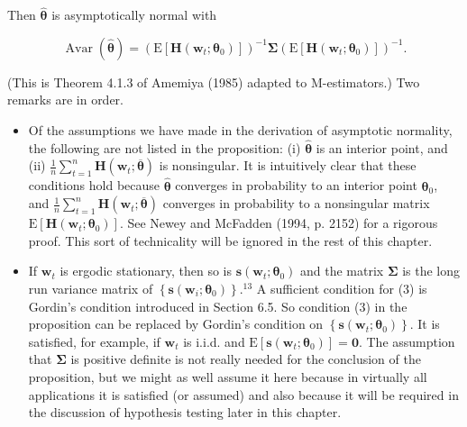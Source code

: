 \documentclass[10pt]{article}
\begin{document}
Then $\hat{\boldsymbol{\theta}}$ is asymptotically normal with

$$
\operatorname{Avar}(\hat{\boldsymbol{\theta}})=\left(\mathrm{E}\left[\mathbf{H}\left(\mathbf{w}_{t} ; \boldsymbol{\theta}_{0}\right)\right]\right)^{-1} \boldsymbol{\Sigma}\left(\mathrm{E}\left[\mathbf{H}\left(\mathbf{w}_{t} ; \boldsymbol{\theta}_{0}\right)\right]\right)^{-1} .
$$

(This is Theorem 4.1.3 of Amemiya (1985) adapted to M-estimators.) Two remarks are in order.

\begin{itemize}
  \item Of the assumptions we have made in the derivation of asymptotic normality, the following are not listed in the proposition: (i) $\hat{\boldsymbol{\theta}}$ is an interior point, and (ii) $\frac{1}{n} \sum_{t=1}^{n} \mathbf{H}\left(\mathbf{w}_{t} ; \overline{\boldsymbol{\theta}}\right)$ is nonsingular. It is intuitively clear that these conditions hold because $\hat{\boldsymbol{\theta}}$ converges in probability to an interior point $\boldsymbol{\theta}_{0}$, and $\frac{1}{n} \sum_{t=1}^{n} \mathbf{H}\left(\mathbf{w}_{t} ; \overline{\boldsymbol{\theta}}\right)$ converges in probability to a nonsingular matrix $\mathrm{E}\left[\mathbf{H}\left(\mathbf{w}_{t} ; \boldsymbol{\theta}_{0}\right)\right]$. See Newey and McFadden (1994, p. 2152) for a rigorous proof. This sort of technicality will be ignored in the rest of this chapter.
  \item If $\mathbf{w}_{t}$ is ergodic stationary, then so is $\mathbf{s}\left(\mathbf{w}_{t} ; \boldsymbol{\theta}_{0}\right)$ and the matrix $\boldsymbol{\Sigma}$ is the long run variance matrix of $\left\{\mathbf{s}\left(\mathbf{w}_{i} ; \boldsymbol{\theta}_{0}\right)\right\} .{ }^{13}$ A sufficient condition for (3) is Gordin's condition introduced in Section 6.5. So condition (3) in the proposition can be replaced by Gordin's condition on $\left\{\mathbf{s}\left(\mathbf{w}_{t} ; \boldsymbol{\theta}_{0}\right)\right\}$. It is satisfied, for example, if $\mathbf{w}_{t}$ is i.i.d. and $\mathrm{E}\left[\mathbf{s}\left(\mathbf{w}_{t} ; \boldsymbol{\theta}_{0}\right)\right]=\mathbf{0}$. The assumption that $\boldsymbol{\Sigma}$ is positive definite is not really needed for the conclusion of the proposition, but we might as well assume it here because in virtually all applications it is satisfied (or assumed) and also because it will be required in the discussion of hypothesis testing later in this chapter.
\end{itemize}
\end{document}
